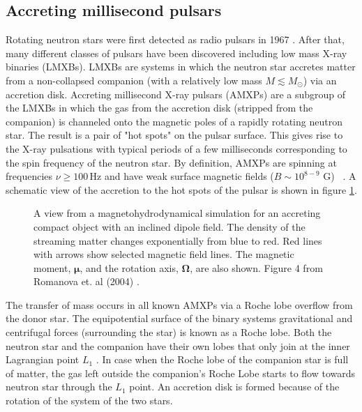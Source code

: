 \documentclass{wihuri}
\newcommand{\bmath}[1]{\boldsymbol{#1}}
\begin{document}


\subsection{Accreting millisecond pulsars}






Rotating neutron stars were first detected as radio pulsars in 1967 \cite{gold68}. %
After that, many different classes of pulsars have been discovered including low mass X-ray binaries (LMXBs). LMXBs are systems in which the neutron star accretes matter from a non-collapsed companion (with a relatively low mass $M \lesssim  M_{\odot}$) via an accretion disk. Accreting millisecond X-ray pulsars (AMXPs) are a subgroup of the LMXBs in which the gas from the accretion disk (stripped from the companion) is channeled onto the magnetic poles of a rapidly rotating neutron star. The result is a pair of "hot spots" on the pulsar surface.  This gives rise to the X-ray pulsations with typical periods of a few milliseconds corresponding to the spin frequency of the neutron star. By definition, AMXPs are spinning at frequencies $\nu \ge 100 \, \mathrm{Hz}$ and have weak surface magnetic fields ($B \sim 10^{8-9}$ G) ~\cite{patruno}. A schematic view of the accretion to the hot spots of the pulsar is shown in figure \ref{fig:shcematic}.


\begin{figure}
\centerline{} 
\caption{A view from a magnetohydrodynamical simulation for an accreting compact object with an inclined dipole field. The density of the streaming matter changes exponentially from blue to red. Red lines with arrows show selected magnetic field lines. The magnetic moment, $\bmath{\mu}$, and the rotation axis, $\bmath{\Omega}$, are also shown. Figure 4 from Romanova et. al (2004) \cite{romanova}.} 
\label{fig:shcematic}
\end{figure}

The transfer of mass occurs in all known AMXPs via a Roche lobe overflow from the donor star. The equipotential surface of the binary systems gravitational and centrifugal forces (surrounding the star) is known as a Roche lobe. Both the neutron star and the companion have their own lobes that only join at the inner Lagrangian point $L_{1}$ \cite{frank85}. %
In case when the Roche lobe of the companion star is full of matter, the gas left outside the companion's Roche Lobe starts to flow towards neutron star through the  $L_{1}$ point. An accretion disk is formed because of the rotation of the system of the two stars.
 
\end{document}
